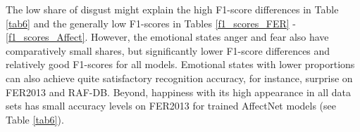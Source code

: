 \documentclass[a4paper, conference]{IEEEtran}
\begin{document}
\begin{table}[htbp]
\begin{center}
\begin{tabular}
\hline
\hline
\end{tabular}
\label{tab7}
\end{center}
\end{table}

The low share of disgust might explain the high F1-score differences in Table \ref{tab6} and the generally low F1-scores in Tables \ref{f1_scores_FER} - \ref{f1_scores_Affect}. However, the emotional states anger and fear also have comparatively small shares, but significantly lower F1-score differences and relatively good F1-scores for all models. Emotional states with lower proportions can also achieve quite satisfactory recognition accuracy, for instance, surprise on FER2013 and RAF-DB. Beyond, happiness with its high appearance in all data sets has small accuracy levels on FER2013 for trained AffectNet models (see Table \ref{tab6}).
\end{document}
